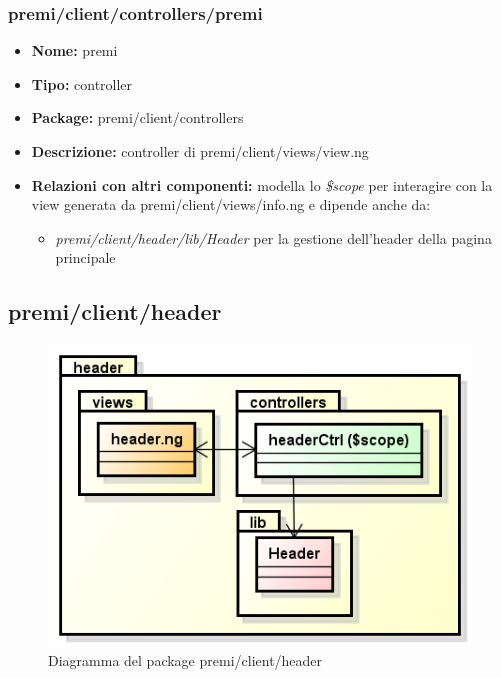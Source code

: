 \subsubsection{premi/client/controllers/premi}
\begin{itemize}
  \item[] \textbf{Nome:} premi
  \item[] \textbf{Tipo:} controller
  \item[] \textbf{Package:} premi/client/controllers
  \item[] \textbf{Descrizione:} controller di premi/client/views/view.ng
  \item[] \textbf{Relazioni con altri componenti:} modella lo \textit{\$scope} per interagire con la view generata da premi/client/views/info.ng e dipende anche da:
 \begin{itemize}
 \item \textit{premi/client/header/lib/Header} per la gestione dell'header della pagina principale
 \end{itemize}
\end{itemize}



\subsection{premi/client/header}

\begin{figure}[h]
\begin{center}
\includegraphics[scale=0.45]{img/diapkg/header.png}
\caption{Diagramma del package premi/client/header}
\end{center}
\end{figure}

